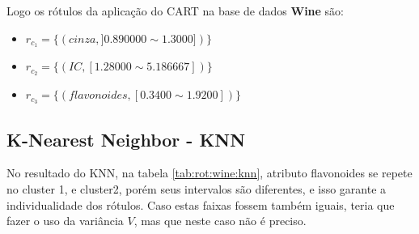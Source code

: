 \begin{table}[!h]
\centering
\caption{Resultado da aplicação do algoritmo CART}
\label{tab:rot:wine:cart}
\end{table}

Logo os rótulos da aplicação do CART na base de dados \textbf{Wine} são:
\begin{itemize}[noitemsep]
    \item ${r_{c_1}=\{ (cinza, ] 0.890000 \sim  1.3000])\} }$
    \item ${r_{c_2}=\{(IC,[  1.28000 \sim  5.186667  ] ) \} }$
    \item ${r_{c_3}=\{ (flavonoides, [ 0.3400 \sim  1.9200])\} }$
 \end{itemize}
 
 
\subsection{K-Nearest Neighbor - KNN} \label{cap:resultados:ssec:wine:knn}

No resultado do KNN, na tabela \ref{tab:rot:wine:knn},  atributo flavonoides se repete no cluster 1, e cluster2, porém seus intervalos são diferentes, e isso garante a individualidade dos rótulos. Caso estas faixas fossem também iguais, teria que fazer o uso da variância ${V}$, mas que neste caso não é preciso. 


